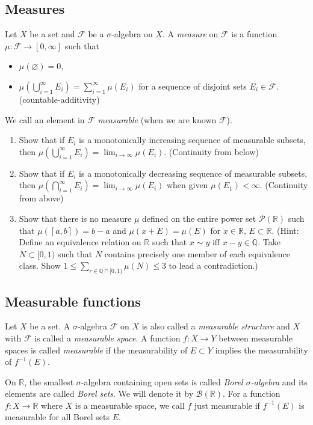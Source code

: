 \documentclass{article}
\def\R{\mathbb{R}}
\def\cF{\mathcal{F}}
\def\cB{\mathcal{B}}
\begin{document}
\subsection*{Measures}
Let $X$ be a set and $\cF$ be a $\sigma$-algebra on $X$.
A \emph{measure} on $\cF$ is a function $\mu:\cF\to[0,\infty]$ such that
\begin{itemize}
\item $\mu(\varnothing)=0$,
\item $\mu(\bigcup_{i=1}^\infty E_i)=\sum_{i=1}^\infty\mu(E_i)$ for a sequence of disjoint sets $E_i\in\cF$. (countable-additivity)
\end{itemize}
We call an element in $\cF$ \emph{measurable} (when we are known $\cF$).
\begin{enumerate}
\item Show that if $E_i$ is a monotonically increasing sequence of measurable subsets, then $\mu(\bigcup_{i=1}^\infty E_i)=\lim_{i\to\infty}\mu(E_i)$. (Continuity from below)
\item Show that if $E_i$ is a monotonically decreasing sequence of measurable subsets, then $\mu(\bigcap_{i=1}^\infty E_i)=\lim_{i\to\infty}\mu(E_i)$ when given $\mu(E_1)<\infty$. (Continuity from above)
\item Show that there is no measure $\mu$ defined on the entire power set $\mathcal{P}(\R)$ such that $\mu([a,b])=b-a$ and $\mu(x+E)=\mu(E)$ for $x\in\R,\,E\subset\R$. (Hint: Define an equivalence relation on $\R$ such that $x\sim y$ iff $x-y\in\mathbb{Q}$. Take $N\subset[0,1)$ such that $N$ contains precisely one member of each equivalence class. Show $1\le\sum_{r\in\mathbb{Q}\cap[0,1)}\mu(N)\le3$ to lead a contradiction.)
\end{enumerate}

\subsection*{Measurable functions}
Let $X$ be a set.
A $\sigma$-algebra $\cF$ on $X$ is also called a \emph{measurable structure} and $X$ with $\cF$ is called a \emph{measurable space}.
A function $f:X\to Y$ between measurable spaces is called \emph{measurable} if the measurability of $E\subset Y$ implies the measurability of $f^{-1}(E)$.

On $\R$, the smallest $\sigma$-algebra containing open sets is called \emph{Borel $\sigma$-algebra} and its elements are called \emph{Borel sets}.
We will denote it by $\cB(\R)$.
For a function $f:X\to\R$ where $X$ is a measurable space, we call $f$ just measurable if $f^{-1}(E)$ is measurable for all Borel sets $E$.
\end{document}
